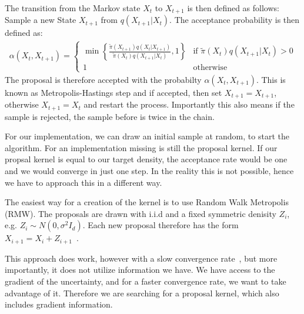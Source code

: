 The transition from the Markov state $X_t$ to $X_{t+1}$ is then defined as follows:
Sample a new State  $X_{t+1}$ from $q(X_{t+1} | X_t)$. 
The acceptance probability is then defined as: 
\begin{align} 
    \alpha(X_t, X_{t+1}) = 
    \begin{cases}
        \min \left\{ \frac{\tilde{\pi}(X_{t+1}) q(X_t|X_{t+1} )}{\tilde{\pi}(X_t) q(X_{t+1}|X_t)}, 1 \right\} & \text{if } \tilde{\pi}(X_t)q(X_{t+1}|X_t)>0 \\
        1 & \text{otherwise}
    \end{cases}     
\end{align}
The proposal is therefore accepted with the probabilty $\alpha(X_t,X_{t+1})$.
This is known as Metropolis-Hastings step and if accepted, then set $X_{t+1}=X_{t+1}$, otherwise $X_{t+1}  = X_t$ and restart the process. 
Importantly this also means if the sample is rejected, the sample before is twice in the chain.

For our implementation, we can draw an initial sample at random, to start the algorithm. For an implementation missing is still the proposal kernel. If our propsal kernel is equal to our target density, the acceptance rate would be one and we would converge in just one step. In the reality this is not possible, hence we have to approach this in a different way.

The easiest way for a creation of the kernel is to use Random Walk Metropolis (RMW). The proposals are drawn with i.i.d and a fixed symmetric denisity $Z_i$, e.g.  $Z_i\sim N(0,\sigma^2 I_d)$.
Each new proposal therefore has the form $X_{i+1} = X_i + Z_{i+1}$~\cite{rosenthal2011optimal}. 

This approach does work, however with a slow convergence rate~\cite{neal2011mcmc}, but more importantly, it does not utilize information we have. 
We have access to the gradient of the uncertainty, and for a faster convergence rate, we want to take advantage of it. Therefore we are searching for a proposal kernel, which also includes gradient information.


